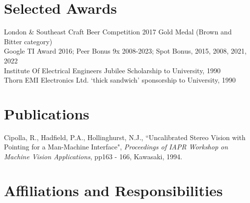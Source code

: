 \documentclass[line]{resume}
\begin{document}
\begin{resume}
    \section{\mysidestyle Selected Awards}

    London \& Southeast Craft Beer Competition 2017 Gold Medal (Brown and Bitter category)            \vspace{0.5mm}\\%
    Google TI Award 2016; Peer Bonus 9x 2008-2023; Spot Bonus, 2015, 2008, 2021, 2022                 \vspace{0.5mm}\\%
    Institute Of Electrical Engineers Jubilee Scholarship to University, 1990                         \vspace{0.5mm}\\%
    Thorn EMI Electronics Ltd. `thick sandwich' sponsorship to University, 1990

    \section{\mysidestyle Publications}

    Cipolla, R., Hadfield, P.A., Hollinghurst, N.J.,
    ``Uncalibrated Stereo Vision with Pointing for a Man-Machine Interface",
    \textsl{Proceedings of IAPR Workshop on Machine Vision Applications}, pp163 - 166, Kawasaki, 1994.

    \section{\mysidestyle Affiliations and Responsibilities}


\end{resume}
\end{document}
